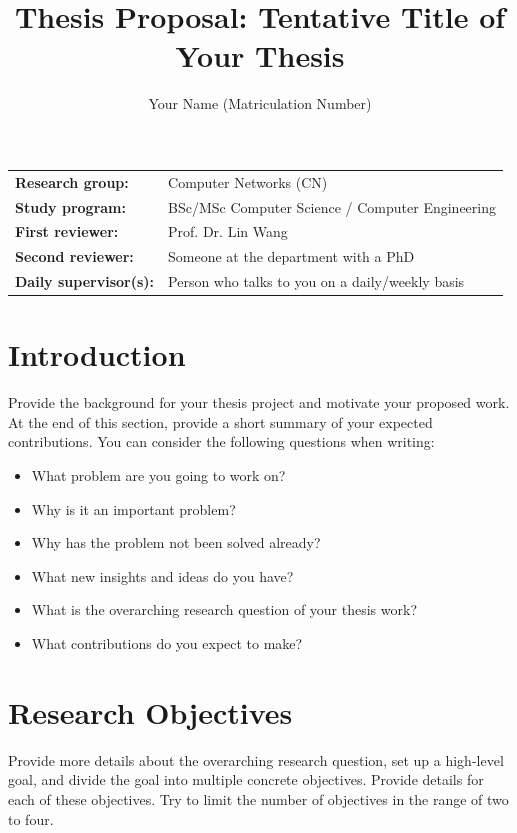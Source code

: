 \documentclass{upb-cn}
\title{Thesis Proposal: Tentative Title of Your Thesis}
\author{Your Name (Matriculation Number)}
\begin{document}
\maketitle

\begin{notebox}
    \begin{tabular}{@{}ll}
        \textbf{Research group:} & Computer Networks (CN) \\
        \textbf{Study program:} & BSc/MSc Computer Science / Computer Engineering \\
        \textbf{First reviewer:} & Prof. Dr. Lin Wang \\
        \textbf{Second reviewer:} & Someone at the department with a PhD \\
        \textbf{Daily supervisor(s):} & Person who talks to you on a daily/weekly basis
    \end{tabular}
\end{notebox}

\section{Introduction}
\label{sec:introduction}

Provide the background for your thesis project and motivate your proposed work. At the end of this section, provide a short summary of your expected contributions. You can consider the following questions when writing:

\begin{itemize}
    \item What problem are you going to work on?
    \item Why is it an important problem?
    \item Why has the problem not been solved already?
    \item What new insights and ideas do you have?
    \item What is the overarching research question of your thesis work?
    \item What contributions do you expect to make?
\end{itemize}

\section{Research Objectives}
\label{sec:objectives}

Provide more details about the overarching research question, set up a high-level goal, and divide the goal into multiple concrete objectives. Provide details for each of these objectives. Try to limit the number of objectives in the range of two to four.
\end{document}
